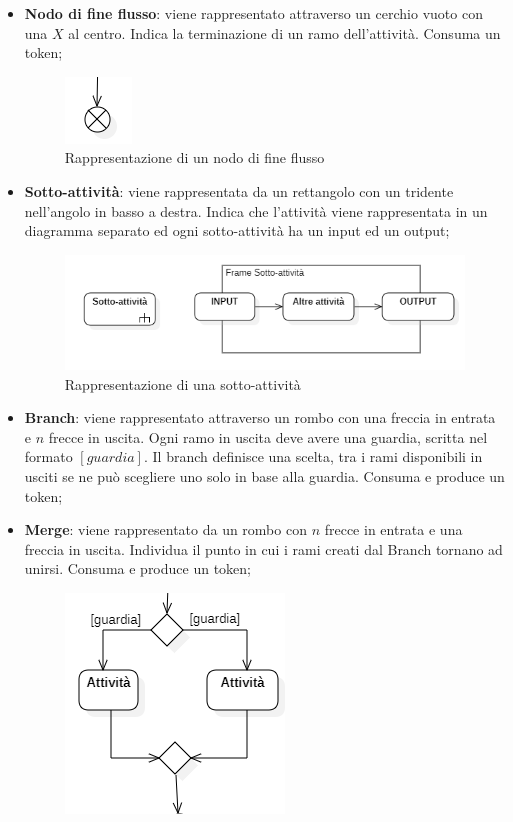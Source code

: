 \begin{itemize}
	\item \textbf{Nodo di fine flusso}: viene rappresentato attraverso un cerchio vuoto con una $X$ al centro. Indica la terminazione di un ramo dell'attività. Consuma un token;
	\begin{figure}[H]
		\centering\includegraphics{../immagini/normeUML/nodoFineFlusso.png}
		\caption{Rappresentazione di un nodo di fine flusso}
	\end{figure}
	\item \textbf{Sotto-attività}: viene rappresentata da un rettangolo con un tridente nell'angolo in basso a destra. Indica che l'attività viene rappresentata in un diagramma separato ed ogni sotto-attività ha un input ed un output;
	\begin{figure}[H]
		\centering\includegraphics{../immagini/normeUML/attSott.png}
		\caption{Rappresentazione di una sotto-attività}
	\end{figure}
	\item \textbf{Branch}: viene rappresentato attraverso un rombo con una freccia in entrata e $n$ frecce in uscita. Ogni ramo in uscita deve avere una guardia, scritta nel formato $[guardia]$. Il branch definisce una scelta, tra i rami disponibili in usciti se ne può scegliere uno solo in base alla guardia. Consuma e produce un token;
	\item \textbf{Merge}: viene rappresentato da un rombo con $n$ frecce in entrata e una freccia in uscita. Individua il punto in cui i rami creati dal Branch tornano ad unirsi. Consuma e produce un token;
		\begin{figure}[H]
		\centering\includegraphics{../immagini/normeUML/mergeBranch.png}

\end{figure}
\end{itemize}
